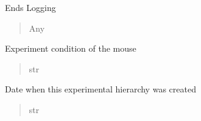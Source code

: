 \documentclass[letterpaper,10pt,english]{sphinxmanual}
\begin{document}
\begin{fulllineitems}
\begin{fulllineitems}
\label{\detokenize{Organization:Organization.Mouse.end_log}}
\pysigstartsignatures
{}
\pysigstopsignatures
\sphinxAtStartPar
Ends Logging
\begin{quote}\begin{description}
\sphinxAtStartPar
Any

\end{description}\end{quote}

\end{fulllineitems}


\begin{fulllineitems}
\label{\detokenize{Organization:Organization.Mouse.experimental_condition}}
\pysigstartsignatures
{}
\pysigstopsignatures
\sphinxAtStartPar
Experiment condition of the mouse
\begin{quote}\begin{description}
\sphinxAtStartPar
str

\end{description}\end{quote}

\end{fulllineitems}


\begin{fulllineitems}
\label{\detokenize{Organization:Organization.Mouse.instance_date}}
\pysigstartsignatures
{}
\pysigstopsignatures
\sphinxAtStartPar
Date when this experimental hierarchy was created
\begin{quote}\begin{description}
\sphinxAtStartPar
str


\end{description}
\end{quote}
\end{fulllineitems}
\end{fulllineitems}
\end{document}
